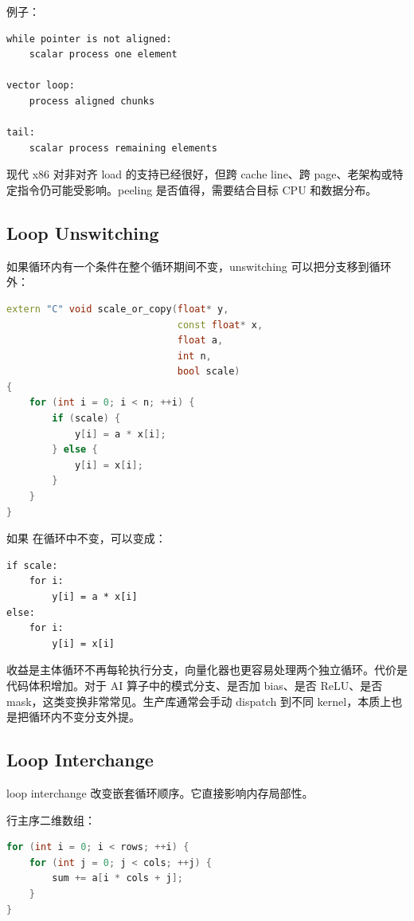 例子：

\begin{lstlisting}
while pointer is not aligned:
    scalar process one element

vector loop:
    process aligned chunks

tail:
    scalar process remaining elements
\end{lstlisting}

现代 x86 对非对齐 load 的支持已经很好，但跨 cache line、跨 page、老架构或特定指令仍可能受影响。peeling 是否值得，需要结合目标 CPU 和数据分布。

\subsection{Loop Unswitching}

如果循环内有一个条件在整个循环期间不变，unswitching 可以把分支移到循环外：

\begin{lstlisting}[language=C++]
extern "C" void scale_or_copy(float* y,
                              const float* x,
                              float a,
                              int n,
                              bool scale)
{
    for (int i = 0; i < n; ++i) {
        if (scale) {
            y[i] = a * x[i];
        } else {
            y[i] = x[i];
        }
    }
}
\end{lstlisting}

如果  在循环中不变，可以变成：

\begin{lstlisting}
if scale:
    for i:
        y[i] = a * x[i]
else:
    for i:
        y[i] = x[i]
\end{lstlisting}

收益是主体循环不再每轮执行分支，向量化器也更容易处理两个独立循环。代价是代码体积增加。对于 AI 算子中的模式分支、是否加 bias、是否 ReLU、是否 mask，这类变换非常常见。生产库通常会手动 dispatch 到不同 kernel，本质上也是把循环内不变分支外提。

\subsection{Loop Interchange}

loop interchange 改变嵌套循环顺序。它直接影响内存局部性。

行主序二维数组：

\begin{lstlisting}[language=C++]
for (int i = 0; i < rows; ++i) {
    for (int j = 0; j < cols; ++j) {
        sum += a[i * cols + j];
    }
}
\end{lstlisting}

